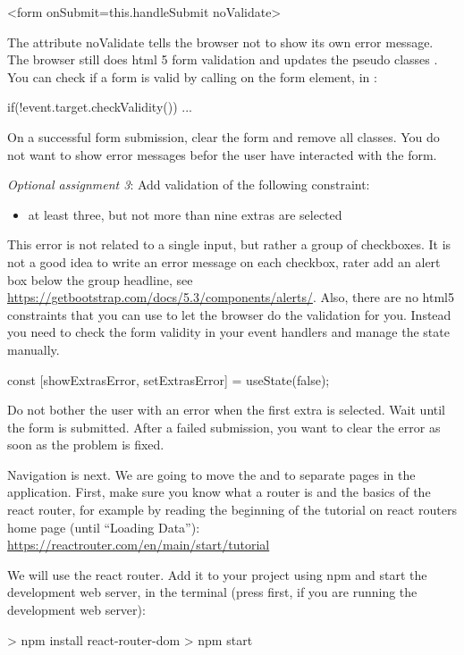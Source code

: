 \documentclass[fleqn, article, a4paper]{memoir}
\begin{document}
\begin{Assignments}
\begin{Code}
<form onSubmit={this.handleSubmit} noValidate>
\end{Code}
The attribute noValidate tells the browser not to show its own error message. The browser still does html 5 form validation and updates the pseudo classes . You can check if a form is valid by calling  on the form element, in :
\begin{Code}
if(!event.target.checkValidity()){ ... }
\end{Code}

\noindent On a successful form submission, clear the form and remove all  classes. You do not want to show error messages befor the user have interacted with the form. 

\item \emph{Optional assignment 3}: Add validation of the following constraint:
\begin{itemize}
  \item at least three, but not more than nine extras are selected
\end{itemize}
This error is not related to a single input, but rather a group of checkboxes. It is not a good idea to write an error message on each checkbox, rater add an alert box below the group headline, see \url{https://getbootstrap.com/docs/5.3/components/alerts/}. Also, there are no html5 constraints that you can use to let the browser do the validation for you. Instead you need to check the form validity in your event handlers and manage the state manually.
\begin{Code}
const [showExtrasError, setExtrasError] = useState(false);
\end{Code}
Do not bother the user with an error when the first extra is selected. Wait until the form is submitted. After a failed submission, you want to clear the error as soon as the problem is fixed.

\item Navigation is next. We are going to move the  and  to separate pages in the application. First, make sure you know what a router is and the basics of the react router, for example by reading the beginning of the tutorial on react routers home page (until ``Loading Data''): 
\\ \url{https://reactrouter.com/en/main/start/tutorial}

\item We will use the react router. Add it to your project using npm and start the development web server, in the terminal (press  first, if you are running the development web server):
\begin{Code}
> npm install react-router-dom
> npm start
\end{Code}


\end{Assignments}
\end{document}
